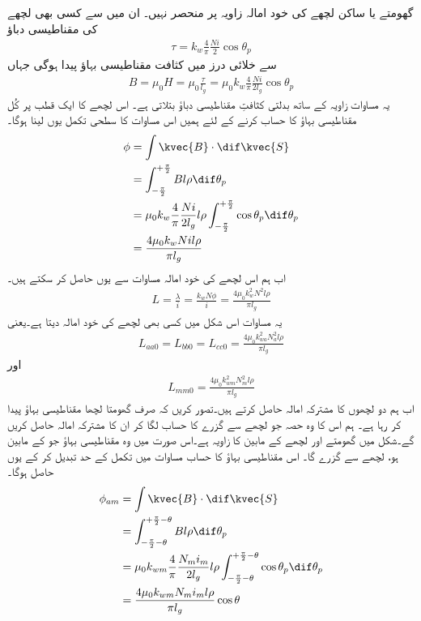 گھومتے یا ساکن لچھے کی خود امالہ  زاویہ  پر منحصر نہیں۔ ان میں سے کسی بھی لچھے کی مقناطیسی دباؤ  
\begin{align}
\tau=k_w \frac{4}{\pi}\frac{N i}{2} \cos \theta_p
\end{align}
سے خلائی درز میں کثافت مقناطیسی بہاؤ   پیدا ہوگی جہاں	
\begin{align}
B=\mu_0 H=\mu_0 \frac{\tau}{l_g}=\mu_0 k_w \frac{4}{\pi}\frac{N i}{2 l_g} \cos \theta_p
\end{align}
یہ مساوات زاویہ  کے ساتھ بدلتی کثافتِ مقناطیسی دباؤ  بتلاتی ہے۔ اس لچھے کا ایک قطب پر  کُل مقناطیسی بہاؤ  کا حساب کرنے کے لئے ہمیں اس مساوات کا سطحی تکمل یوں لینا ہوگا۔
\begin{gather}
\begin{aligned}
\phi&=\int \kvec{B} \cdot \dif \kvec{S}\\
&=\int_{-\frac{\pi}{2}}^{+\frac{\pi}{2}} B l \rho \dif \theta_p\\
&=\mu_0 k_w \frac{4}{\pi}\frac{N i}{2 l_g} l \rho \int_{-\frac{\pi}{2}}^{+\frac{\pi}{2}}  \cos  \theta_p \dif \theta_p\\
&=\frac{4 \mu_0 k_w N i l \rho}{\pi l_g}
\end{aligned}
\end{gather}
اب ہم اس لچھے کی خود امالہ  مساوات  سے یوں حاصل کر سکتے ہیں۔
\begin{align}
L=\frac{\lambda}{i}=\frac{k_w N \phi}{i}=\frac{4 \mu_0 k_w^2 N^2  l \rho}{\pi l_g}
\end{align}
یہ مساوات اس شکل میں کسی بھی لچھے کی خود امالہ دیتا ہے۔یعنی
\begin{align}
L_{aa0}=L_{bb0}=L_{cc0}=\frac{4 \mu_0 k_{wa}^2 N_a^2  l \rho}{\pi l_g}
\end{align}
اور
\begin{align}
L_{mm0}=\frac{4 \mu_0 k_{wm}^2 N_m^2  l \rho}{\pi l_g}
\end{align}
اب ہم دو لچھوں کا مشترکہ امالہ حاصل کرتے ہیں۔تصور کریں کہ صرف  گھومتا لچھا مقناطیسی بہاؤ پیدا کر رہا ہے۔ ہم اس کا وہ حصہ جو  لچھے  سے گزرے کا حساب لگا کر ان کا مشترکہ امالہ حاصل کریں گے۔شکل  میں گھومتے اور  لچھے کے مابین کا زاویہ  ہے۔اس صورت میں وہ مقناطیسی بہاؤ جو  کے مابین ہو،  لچھے سے گزرے گا۔ اس مقناطیسی بہاؤ کا حساب مساوات  میں تکمل کے حد تبدیل کر کے یوں حاصل ہوگا۔
\begin{gather}
\begin{aligned}
\phi_{am}&=\int \kvec{B} \cdot \dif \kvec{S}\\
&=\int_{-\frac{\pi}{2}-\theta}^{+\frac{\pi}{2}-\theta} B l \rho \dif \theta_p\\
&=\mu_0 k_{wm} \frac{4}{\pi}\frac{N_m i_m}{2 l_g} l \rho \int_{-\frac{\pi}{2}-\theta}^{+\frac{\pi}{2}-\theta} \cos \theta_p \dif \theta_p\\
&=\frac{4 \mu_0 k_{wm}  N_m i_m l \rho}{\pi l_g} \cos \theta
\end{aligned}
\end{gather}
